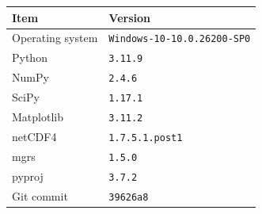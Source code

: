 \begin{tabular}{ll}
\toprule
Item & Version \\
\midrule
Operating system & \texttt{Windows-10-10.0.26200-SP0} \\
Python & \texttt{3.11.9} \\
NumPy & \texttt{2.4.6} \\
SciPy & \texttt{1.17.1} \\
Matplotlib & \texttt{3.11.2} \\
netCDF4 & \texttt{1.7.5.1.post1} \\
mgrs & \texttt{1.5.0} \\
pyproj & \texttt{3.7.2} \\
Git commit & \texttt{39626a8} \\
\bottomrule
\end{tabular}
